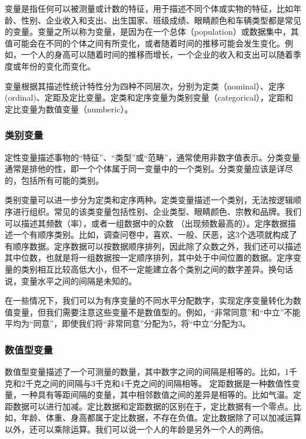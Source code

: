 \documentclass[]{book}
\begin{document}
变量是指任何可以被测量或计数的特征，用于描述不同个体或实物的特征，比如年龄、性别、企业收入和支出、出生国家、班级成绩、眼睛颜色和车辆类型都是常见的变量。变量之所以称为变量，是因为在一个总体（population）或数据集中，其值可能会在不同的个体之间有所变化，或者随着时间的推移可能会发生变化。例如，一个人的身高可以随着时间的推移而增长，一个企业的收入和支出可以随着季度或年份的变化而变化。

变量根据其描述性统计特性分为四种不同层次，分别为定类（nominal）、定序(ordinal)、定距及定比变量。定类和定序变量为类别变量（categorical），定距和定比变量为数值变量（numberic）。

\hypertarget{ux7c7bux522bux53d8ux91cf}{%
\subsubsection{类别变量}\label{ux7c7bux522bux53d8ux91cf}}

定性变量描述事物的``特征''、``类型''或``范畴''，通常使用非数字值表示。分类变量通常是排他的性，即一个个体属于同一变量中的一个类别。分类变量应该是详尽的，包括所有可能的类别。

类别变量可以进一步分为定类和定序两种。定类变量描述一个类别，无法按逻辑顺序进行组织。常见的该类变量包括性别、企业类型、眼睛颜色、宗教和品牌。我们可以描述其频数（率），或者一组数据中的众数 （出现频数最高的）。定序数据描述一个有顺序类别。比如，调查问卷中，喜欢、一般、厌恶，这3个选项就构成了有顺序数据。定序数据可以按数据顺序排列，因此除了众数之外，我们还可以描述其中位数，也就是将一组数据按一定顺序排列，其中处于中间位置的数据。定序变量的类别相互比较高低大小，但不一定能建立各个类别之间的数字差异。换句话说，变量水平之间的间隔是未知的。

在一些情况下，我们可以为有序变量的不同水平分配数字，实现定序变量转化为数值变量，但我们需要注意这些变量不是数值型的。例如，``非常同意''和``中立''不能平均为``同意''，即使我们将``非常同意''分配为5，将``中立''分配为3。

\hypertarget{ux6570ux503cux578bux53d8ux91cf}{%
\subsubsection{数值型变量}\label{ux6570ux503cux578bux53d8ux91cf}}

数值型变量描述了一个可测量的数量，其中数字之间的间隔是相等的。比如，1千克和2千克之间的间隔与3千克和4千克之间的间隔相等。
定距数据是一种数值性变量，一种具有等距间隔的变量，其中相邻数值之间的差异是相等的。比如气温。定距数据可以进行加减。定比数据和定距数据的区别在于，定比数据有一个零点。比如，年龄、体重、身高都属于定比数据，不存在负值。定比数据除了可以加减运算以外，还可以乘除运算。我们可以说一个人的年龄是另外一个人的两倍。
\end{document}
